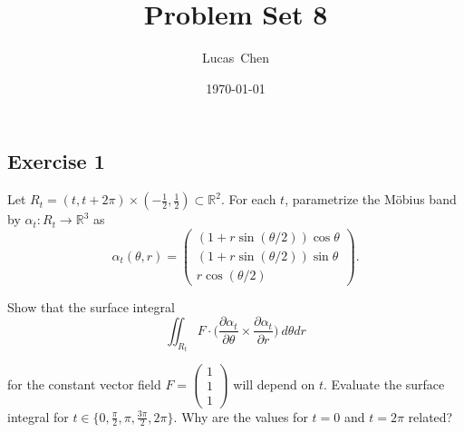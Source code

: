 \documentclass{amsart}
\title{Problem Set 8}
\author{Lucas\ Chen}
\date{\today}
\begin{document}
\maketitle

\subsection*{Exercise 1} Let $R_t=(t,t+2\pi)\times(-\frac{1}{2},\frac{1}{2})\subset\mathbb{R}^2$. For each $t$, parametrize the M\"obius band by $\alpha_t:R_t\rightarrow\mathbb{R}^3$ as
\begin{equation*}
\alpha_t(\theta,r)=\begin{pmatrix}(1+r\sin(\theta/2))\cos\theta \\ (1+r\sin(\theta/2))\sin\theta \\ r\cos(\theta/2)\end{pmatrix}.
\end{equation*}

\noindent Show that the surface integral
\begin{equation*}
\iint_{R_t}F\cdot\bigg(\frac{\partial\alpha_t}{\partial\theta}\times\frac{\partial\alpha_t}{\partial r}\bigg)\:d\theta dr
\end{equation*}

\noindent for the constant vector field $F=\begin{pmatrix}1 \\ 1 \\ 1\end{pmatrix}$ will depend on $t$. Evaluate the surface integral for $t\in\{0,\frac{\pi}{2},\pi,\frac{3\pi}{2},2\pi\}$. Why are the values for $t=0$ and $t=2\pi$ related?
\end{document}
